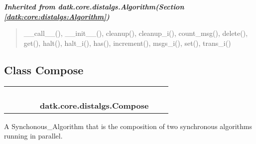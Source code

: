 \large{\textbf{\textit{Inherited from datk.core.distalgs.Algorithm\textit{(Section \ref{datk:core:distalgs:Algorithm})}}}}

\begin{quote}
\_\_call\_\_(), \_\_init\_\_(), cleanup(), cleanup\_i(), count\_msg(), delete(), get(), halt(), halt\_i(), has(), increment(), msgs\_i(), set(), trans\_i()
\end{quote}


\subsection{Class Compose}

    \label{datk:core:distalgs:Compose}
\begin{tabular}{cccccccc}
\multicolumn{2}{r}{\settowidth{\BCL}{datk.core.distalgs.Algorithm}\multirow{2}{\BCL}{datk.core.distalgs.Algorithm}}
&&
&&
  \\\cline{3-3}
  &&\multicolumn{1}{c|}{}
&&
&&
  \\
\multicolumn{4}{r}{\settowidth{\BCL}{datk.core.distalgs.Synchronous\_Algorithm}\multirow{2}{\BCL}{datk.core.distalgs.Synchronous\_Algorithm}}
&&
  \\\cline{5-5}
  &&&&\multicolumn{1}{c|}{}
&&
  \\
&&&&\multicolumn{2}{l}{\textbf{datk.core.distalgs.Compose}}
\end{tabular}

A Synchonous\_Algorithm that is the composition of two synchronous 
algorithms running in parallel.



